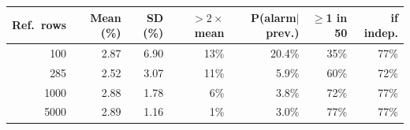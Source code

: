 \begin{tabular}{rrrrrrr}
\toprule
\textbf{Ref.\ rows} & \textbf{Mean (\%)} & \textbf{SD (\%)} & \textbf{$>2\times$ mean} & \textbf{P(alarm$\mid$prev.)} & \textbf{$\geq$1 in 50} & \textbf{if indep.} \\
\midrule
100 & 2.87 & 6.90 & 13\% & 20.4\% & 35\% & 77\% \\
285 & 2.52 & 3.07 & 11\% & 5.9\% & 60\% & 72\% \\
1000 & 2.88 & 1.78 & 6\% & 3.8\% & 72\% & 77\% \\
5000 & 2.89 & 1.16 & 1\% & 3.0\% & 77\% & 77\% \\
\bottomrule
\end{tabular}

